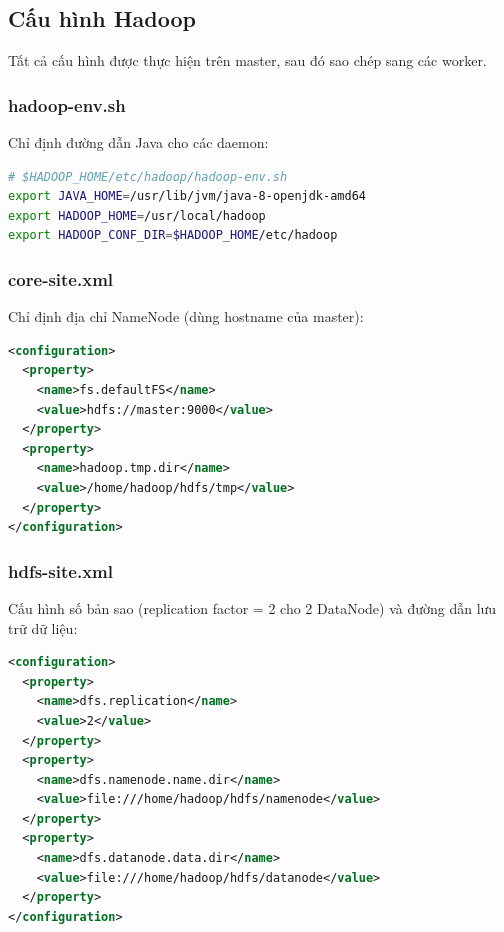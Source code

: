 \subsection{Cấu hình Hadoop}

Tất cả cấu hình được thực hiện trên master, sau đó sao chép sang các worker.

\subsubsection{hadoop-env.sh}

Chỉ định đường dẫn Java cho các daemon:

\begin{lstlisting}[language=bash, numbers=none]
# $HADOOP_HOME/etc/hadoop/hadoop-env.sh
export JAVA_HOME=/usr/lib/jvm/java-8-openjdk-amd64
export HADOOP_HOME=/usr/local/hadoop
export HADOOP_CONF_DIR=$HADOOP_HOME/etc/hadoop
\end{lstlisting}

\subsubsection{core-site.xml}

Chỉ định địa chỉ NameNode (dùng hostname của master):

\begin{lstlisting}[language=xml, numbers=none]
<configuration>
  <property>
    <name>fs.defaultFS</name>
    <value>hdfs://master:9000</value>
  </property>
  <property>
    <name>hadoop.tmp.dir</name>
    <value>/home/hadoop/hdfs/tmp</value>
  </property>
</configuration>
\end{lstlisting}

\subsubsection{hdfs-site.xml}

Cấu hình số bản sao (replication factor = 2 cho 2 DataNode) và đường dẫn lưu trữ dữ liệu:

\begin{lstlisting}[language=xml, numbers=none]
<configuration>
  <property>
    <name>dfs.replication</name>
    <value>2</value>
  </property>
  <property>
    <name>dfs.namenode.name.dir</name>
    <value>file:///home/hadoop/hdfs/namenode</value>
  </property>
  <property>
    <name>dfs.datanode.data.dir</name>
    <value>file:///home/hadoop/hdfs/datanode</value>
  </property>
</configuration>
\end{lstlisting}

